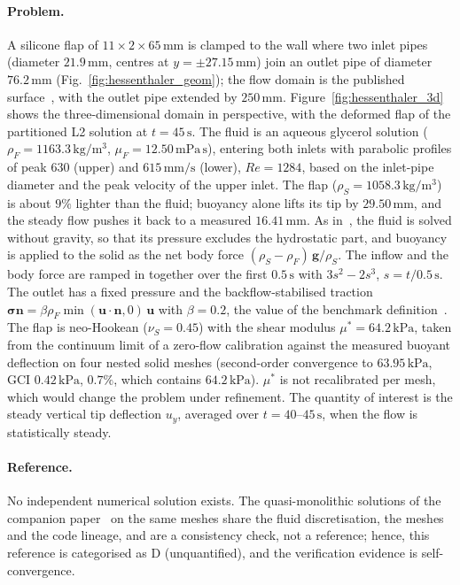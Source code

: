 \paragraph{Problem.}
A silicone flap of $11 \times 2 \times 65\,\mathrm{mm}$ is clamped to the wall where two inlet pipes (diameter $21.9\,\mathrm{mm}$, centres at $y = \pm27.15\,\mathrm{mm}$) join an outlet pipe of diameter $76.2\,\mathrm{mm}$ (Fig.~\ref{fig:hessenthaler_geom}); the flow domain is the published surface~\citep{Hessenthaler2017a}, with the outlet pipe extended by $250\,\mathrm{mm}$.
Figure~\ref{fig:hessenthaler_3d} shows the three-dimensional domain in perspective, with the deformed flap of the partitioned L2 solution at $t = 45\,\mathrm{s}$.
The fluid is an aqueous glycerol solution ($\rho_F = 1163.3\,\mathrm{kg/m^3}$, $\mu_F = 12.50\,\mathrm{mPa\,s}$), entering both inlets with parabolic profiles of peak $630$ (upper) and $615\,\mathrm{mm/s}$ (lower), $Re = 1284$, based on the inlet-pipe diameter and the peak velocity of the upper inlet.
The flap ($\rho_S = 1058.3\,\mathrm{kg/m^3}$) is about $9\%$ lighter than the fluid; buoyancy alone lifts its tip by $29.50\,\mathrm{mm}$, and the steady flow pushes it back to a measured $16.41\,\mathrm{mm}$.
As in~\citep{Hessenthaler2017b}, the fluid is solved without gravity, so that its pressure excludes the hydrostatic part, and buoyancy is applied to the solid as the net body force $(\rho_S - \rho_F)\,\mathbf{g}/\rho_S$. The inflow and the body force are ramped in together over the first $0.5\,\mathrm{s}$ with $3s^2 - 2s^3$, $s = t/0.5\,\mathrm{s}$.
The outlet has a fixed pressure and the backflow-stabilised traction $\boldsymbol{\sigma}\mathbf{n} = \beta \rho_F \min(\mathbf{u}\cdot\mathbf{n}, 0)\,\mathbf{u}$ with $\beta = 0.2$, the value of the benchmark definition~\citep{Hessenthaler2017b,EsmailyMoghadam2011}.
The flap is neo-Hookean ($\nu_S = 0.45$) with the shear modulus $\mu^* = 64.2\,\mathrm{kPa}$, taken from the continuum limit of a zero-flow calibration against the measured buoyant deflection on four nested solid meshes (second-order convergence to $63.95\,\mathrm{kPa}$, GCI $0.42\,\mathrm{kPa}$, $0.7\%$, which contains $64.2\,\mathrm{kPa}$). $\mu^*$ is not recalibrated per mesh, which would change the problem under refinement.
The quantity of interest is the steady vertical tip deflection $u_y$, averaged over $t = 40$--$45\,\mathrm{s}$, when the flow is statistically steady.

\paragraph{Reference.}
No independent numerical solution exists. The quasi-monolithic solutions of the companion paper~\citep{CardiffBatistic2026QM} on the same meshes share the fluid discretisation, the meshes and the code lineage, and are a consistency check, not a reference; hence, this reference is categorised as D (unquantified), and the verification evidence is self-convergence.

